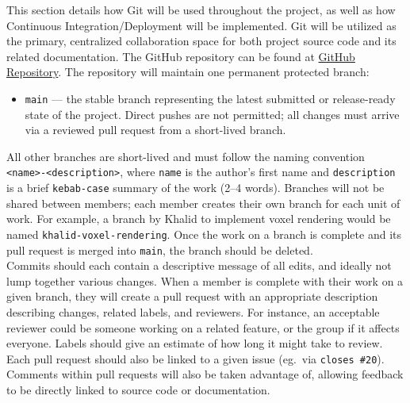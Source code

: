 \documentclass{article}
\begin{document}

This section details how Git will be used throughout the project, as well as how Continuous Integration/Deployment will be implemented. Git will be utilized as the primary, centralized collaboration space for both project
source code and its related documentation. The GitHub repository can be found at \href{https://github.com/OmarHassanAdelhamid/Five-of-a-Kind-capstone-project-/}{GitHub Repository}. The repository will maintain one permanent protected branch:

\begin{itemize}
  \item \texttt{main} --- the stable branch representing the latest submitted or
  release-ready state of the project. Direct pushes are not permitted; all changes
  must arrive via a reviewed pull request from a short-lived branch.
\end{itemize}

All other branches are short-lived and must follow the naming convention
\texttt{<name>-<description>}, where \texttt{name} is the author's first name and
\texttt{description} is a brief \texttt{kebab-case} summary of the work (2--4 words).
Branches will not be shared between members; each member creates their own branch
for each unit of work. For example, a branch by Khalid to implement voxel rendering
would be named \texttt{khalid-voxel-rendering}. Once the work on a branch is complete
and its pull request is merged into \texttt{main}, the branch should be deleted.\\

Commits should each contain a descriptive message of all edits, and ideally not lump together various changes.
When a member is complete with their work on a given branch, they will create a pull request
with an appropriate description describing changes, related labels, and reviewers.
For instance, an acceptable reviewer could be someone working on a related feature,
or the group if it affects everyone. Labels should give an estimate of how long it might take to
review. Each pull request should also be linked to a given issue (eg.\ via \texttt{closes \#20}). Comments within pull
requests will also be taken advantage of, allowing feedback to be directly linked to source
code or documentation.
\end{document}
